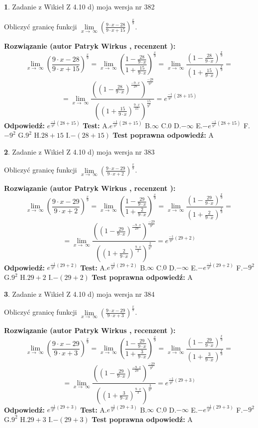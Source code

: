 \documentclass[12pt, a4paper]{article}
\theoremstyle{definition} %
\newtheorem{zad}{}
\newcommand{\zadStart}[1]{\begin{zad}#1\newline}
\newcommand{\zadStop}{\end{zad}}
\newcommand{\rozwStart}[2]{\noindent \textbf{Rozwiązanie (autor #1 , recenzent #2): }\newline}
\newcommand{\rozwStop}{\newline}
\newcommand{\odpStart}{\noindent \textbf{Odpowiedź:}\newline}
\newcommand{\odpStop}{\newline}
\newcommand{\testStart}{\noindent \textbf{Test:}\newline}
\newcommand{\testStop}{\newline}
\newcommand{\kluczStart}{\noindent \textbf{Test poprawna odpowiedź:}\newline}
\newcommand{\kluczStop}{\newline}
\begin{document}
\zadStart{Zadanie z Wikieł Z 4.10 d) moja wersja nr 382}


Obliczyć granicę funkcji  $\lim\limits_{x\to\ \infty}(\frac{9\cdot x-28}{9\cdot x+15})^{\frac{x}{9}}$.
\zadStop
\rozwStart{Patryk Wirkus}{}
$$\lim\limits_{x\to\ \infty}(\frac{9\cdot x-28}{9\cdot x+15})^{\frac{x}{9}} = \lim\limits_{x\to\ \infty}(\frac{1-\frac{28}{9\cdot x}}{1+\frac{15}{9\cdot x}})^{\frac{x}{9}}=\lim\limits_{x\to\ \infty}\frac{(1-\frac{28}{9\cdot x})^{\frac{x}{9}}}{(1+\frac{15}{9\cdot x})^{\frac{x}{9}}}=$$
$$=\lim\limits_{x\to\ \infty}\frac{((1-\frac{28}{9\cdot x})^{\frac{-9\cdot x}{28}})^{\frac{-28}{9^{2}}}}{((1+\frac{15}{9\cdot x})^{\frac{9\cdot x}{15}})^{\frac{15}{9^{2}}}}=e^{\frac{-1}{9^{2}}(28+15)}$$
\rozwStop
\odpStart
$e^{\frac{-1}{9^{2}}(28+15)}$
\odpStop
\testStart
A.$e^{\frac{-1}{9^{2}}(28+15)}$ B.$\infty$ C.$0$ D.$-\infty$ E.$-e^{\frac{-1}{9^{2}}(28+15)}$
F.$-9^{2}$ G.$9^{2}$
H.$28+15$
I.$-(28+15)$
\testStop
\kluczStart
A
\kluczStop



\zadStart{Zadanie z Wikieł Z 4.10 d) moja wersja nr 383}


Obliczyć granicę funkcji  $\lim\limits_{x\to\ \infty}(\frac{9\cdot x-29}{9\cdot x+2})^{\frac{x}{9}}$.
\zadStop
\rozwStart{Patryk Wirkus}{}
$$\lim\limits_{x\to\ \infty}(\frac{9\cdot x-29}{9\cdot x+2})^{\frac{x}{9}} = \lim\limits_{x\to\ \infty}(\frac{1-\frac{29}{9\cdot x}}{1+\frac{2}{9\cdot x}})^{\frac{x}{9}}=\lim\limits_{x\to\ \infty}\frac{(1-\frac{29}{9\cdot x})^{\frac{x}{9}}}{(1+\frac{2}{9\cdot x})^{\frac{x}{9}}}=$$
$$=\lim\limits_{x\to\ \infty}\frac{((1-\frac{29}{9\cdot x})^{\frac{-9\cdot x}{29}})^{\frac{-29}{9^{2}}}}{((1+\frac{2}{9\cdot x})^{\frac{9\cdot x}{2}})^{\frac{2}{9^{2}}}}=e^{\frac{-1}{9^{2}}(29+2)}$$
\rozwStop
\odpStart
$e^{\frac{-1}{9^{2}}(29+2)}$
\odpStop
\testStart
A.$e^{\frac{-1}{9^{2}}(29+2)}$ B.$\infty$ C.$0$ D.$-\infty$ E.$-e^{\frac{-1}{9^{2}}(29+2)}$
F.$-9^{2}$ G.$9^{2}$
H.$29+2$
I.$-(29+2)$
\testStop
\kluczStart
A
\kluczStop



\zadStart{Zadanie z Wikieł Z 4.10 d) moja wersja nr 384}


Obliczyć granicę funkcji  $\lim\limits_{x\to\ \infty}(\frac{9\cdot x-29}{9\cdot x+3})^{\frac{x}{9}}$.
\zadStop
\rozwStart{Patryk Wirkus}{}
$$\lim\limits_{x\to\ \infty}(\frac{9\cdot x-29}{9\cdot x+3})^{\frac{x}{9}} = \lim\limits_{x\to\ \infty}(\frac{1-\frac{29}{9\cdot x}}{1+\frac{3}{9\cdot x}})^{\frac{x}{9}}=\lim\limits_{x\to\ \infty}\frac{(1-\frac{29}{9\cdot x})^{\frac{x}{9}}}{(1+\frac{3}{9\cdot x})^{\frac{x}{9}}}=$$
$$=\lim\limits_{x\to\ \infty}\frac{((1-\frac{29}{9\cdot x})^{\frac{-9\cdot x}{29}})^{\frac{-29}{9^{2}}}}{((1+\frac{3}{9\cdot x})^{\frac{9\cdot x}{3}})^{\frac{3}{9^{2}}}}=e^{\frac{-1}{9^{2}}(29+3)}$$
\rozwStop
\odpStart
$e^{\frac{-1}{9^{2}}(29+3)}$
\odpStop
\testStart
A.$e^{\frac{-1}{9^{2}}(29+3)}$ B.$\infty$ C.$0$ D.$-\infty$ E.$-e^{\frac{-1}{9^{2}}(29+3)}$
F.$-9^{2}$ G.$9^{2}$
H.$29+3$
I.$-(29+3)$
\testStop
\kluczStart
A
\kluczStop
\end{document}
